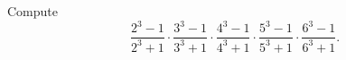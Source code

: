 Compute \[\dfrac{2^3-1}{2^3+1}\cdot\dfrac{3^3-1}{3^3+1}\cdot\dfrac{4^3-1}{4^3+1}\cdot\dfrac{5^3-1}{5^3+1}\cdot\dfrac{6^3-1}{6^3+1}.\]